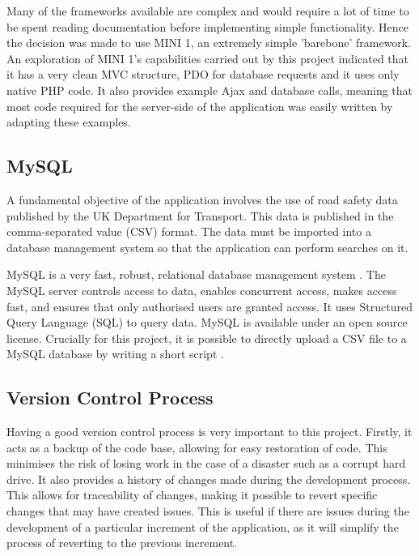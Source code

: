 \documentclass[authoryearcitations]{UoYCSproject}
\begin{document}
Many of the frameworks available are complex and would require a lot of time to be spent reading documentation before implementing simple functionality. Hence the decision was made to use MINI 1\citep{mini}, an extremely simple 'barebone' framework. An exploration of MINI 1's capabilities carried out by this project indicated that it has a very clean MVC structure, PDO for database requests and it uses only native PHP code. It also provides example Ajax and database calls, meaning that most code required for the server-side of the application was easily written by adapting these examples.

\subsection{MySQL}

A fundamental objective of the application involves the use of road safety data published by the UK Department for Transport. This data is published in the comma-separated value (CSV) format. The data must be imported into a database management system so that the application can perform searches on it.

MySQL is a very fast, robust, relational database management system \citep{Welling2005}. The MySQL server controls access to data, enables concurrent access, makes access fast, and ensures that only authorised users are granted access. It uses Structured Query Language (SQL) to query data. MySQL is available under an open source license. Crucially for this project, it is possible to directly upload a CSV file to a MySQL database by writing a short script \citep{MySQLTutorial}.

\subsection{Version Control Process}

Having a good version control process is very important to this project. Firstly, it acts as a backup of the code base, allowing for easy restoration of code. This minimises the risk of losing work in the case of a disaster such as a corrupt hard drive. It also provides a history of changes made during the development process. This allows for traceability of changes, making it possible to revert specific changes that may have created issues. This is useful if there are issues during the development of a particular increment of the application, as it will simplify the process of reverting to the previous increment.
\end{document}
